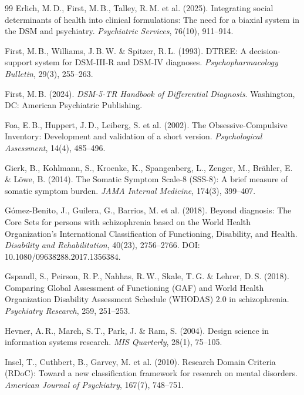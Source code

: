 \documentclass[11pt,a4paper]{article}
\begin{document}
\begin{thebibliography}{99}
Erlich, M.\,D., First, M.\,B., Talley, R.\,M. et al. (2025).
\newblock Integrating social determinants of health into clinical formulations: The need for a biaxial system in the DSM and psychiatry.
\newblock \textit{Psychiatric Services}, 76(10), 911--914.

First, M.\,B., Williams, J.\,B.\,W. \& Spitzer, R.\,L. (1993).
\newblock DTREE: A decision-support system for DSM-III-R and DSM-IV diagnoses.
\newblock \textit{Psychopharmacology Bulletin}, 29(3), 255--263.

First, M.\,B. (2024).
\newblock \textit{DSM-5-TR Handbook of Differential Diagnosis}.
\newblock Washington, DC: American Psychiatric Publishing.

Foa, E.\,B., Huppert, J.\,D., Leiberg, S. et al. (2002).
\newblock The Obsessive-Compulsive Inventory: Development and validation of a short version.
\newblock \textit{Psychological Assessment}, 14(4), 485--496.

Gierk, B., Kohlmann, S., Kroenke, K., Spangenberg, L., Zenger, M., Br\"ahler, E. \& L\"owe, B. (2014).
\newblock The Somatic Symptom Scale-8 (SSS-8): A brief measure of somatic symptom burden.
\newblock \textit{JAMA Internal Medicine}, 174(3), 399--407.

G{\'o}mez-Benito, J., Guilera, G., Barrios, M. et al. (2018).
\newblock Beyond diagnosis: The Core Sets for persons with schizophrenia based on the World Health Organization's International Classification of Functioning, Disability, and Health.
\newblock \textit{Disability and Rehabilitation}, 40(23), 2756--2766. DOI: 10.1080/09638288.2017.1356384.

Gspandl, S., Peirson, R.\,P., Nahhas, R.\,W., Skale, T.\,G. \& Lehrer, D.\,S. (2018).
\newblock Comparing Global Assessment of Functioning (GAF) and World Health Organization Disability Assessment Schedule (WHODAS) 2.0 in schizophrenia.
\newblock \textit{Psychiatry Research}, 259, 251--253.

Hevner, A.\,R., March, S.\,T., Park, J. \& Ram, S. (2004).
\newblock Design science in information systems research.
\newblock \textit{MIS Quarterly}, 28(1), 75--105.

Insel, T., Cuthbert, B., Garvey, M. et al. (2010).
\newblock Research Domain Criteria (RDoC): Toward a new classification framework for research on mental disorders.
\newblock \textit{American Journal of Psychiatry}, 167(7), 748--751.


\end{thebibliography}
\end{document}
